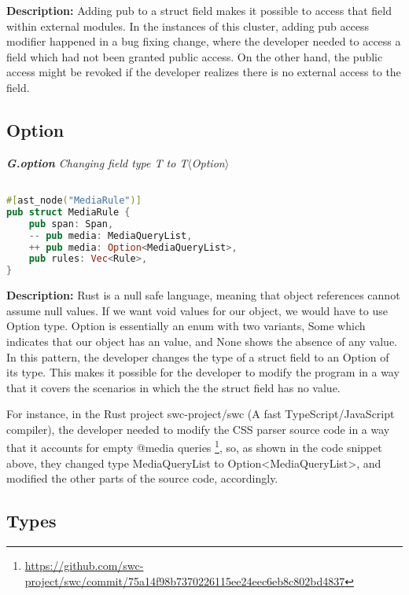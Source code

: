 \noindent \textbf{Description:} Adding pub to a struct field makes it possible to access that field within external modules. In the instances of this cluster, adding pub access modifier happened in a bug fixing change, where the developer needed to access a field which had not been granted public access. On the other hand, the public access might be revoked if the developer realizes there is no external access to the field.

\subsection{Option}
\vspace{3mm}

\noindent \textit{ \textbf{G.option} Changing field type T to T$\langle$Option$\rangle$}

\begin{lstlisting}[language=Rust, style=colouredRust, label={l3}]

#[ast_node("MediaRule")]
pub struct MediaRule {
    pub span: Span,
    -- pub media: MediaQueryList,
    ++ pub media: Option<MediaQueryList>,
    pub rules: Vec<Rule>,
}

\end{lstlisting}

\noindent \textbf{Description:} Rust is a null safe language, meaning that object references cannot assume null values. If we want void values for our object, we would have to use Option type. Option is essentially an enum with two variants, Some which indicates that our object has an value, and None shows the absence of any value. In this pattern, the developer changes the type of a struct field to an Option of its type. This makes it possible for the developer to modify the program in a way that it covers the scenarios in which the the struct field has no value.

For instance, in the Rust project swc-project/swc (A fast TypeScript/JavaScript compiler), the developer needed to modify the CSS parser source code in a way that it accounts for empty @media queries \footnote{\url{https://github.com/swc-project/swc/commit/75a14f98b7370226115ee24eec6eb8c802bd4837}}, so, as shown in the code snippet above, they changed type MediaQueryList to Option<MediaQueryList>, and modified the other parts of the source code, accordingly.


\subsection{Types}
\vspace{3mm}

